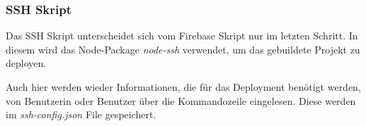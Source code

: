 \subsubsection{SSH Skript}
Das SSH Skript unterscheidet sich vom Firebase Skript nur im letzten Schritt.
In diesem wird das Node-Package \textit{node-ssh} verwendet, um das gebuildete Projekt zu deployen.

Auch hier werden wieder Informationen, die für das Deployment benötigt werden, von Benutzerin oder Benutzer über
die Kommandozeile eingelesen.
Diese werden im \textit{ssh-config.json} File gespeichert.
